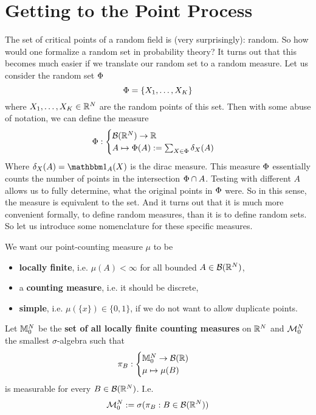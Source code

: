 \section{Getting to the Point Process}

The set of critical points of a random field is (very surprisingly): random.
So how would one formalize a random set in probability theory? It turns
out that this becomes much easier if we translate our random set to a random
measure. Let us consider the random set \(\Phi\)
\[
	\Phi = \{ X_1, \dots, X_K\}
\]
where \(X_1,\dots, X_K\in\mathbb{R}^N\) are the random points of this set. Then with some
abuse of notation, we can define the measure
\[
	\Phi :
	\begin{cases}
		\mathcal{B}(\mathbb{R}^N) \to \mathbb{R} \\
		A \mapsto \Phi(A):= \sum_{X\in \Phi}\delta_X(A) 
	\end{cases}
\]
Where \(\delta_X(A)=\ind_A(X)\) is the dirac measure. This measure \(\Phi\)
essentially counts the number of points in the intersection \(\Phi\cap A\).
Testing with different \(A\) allows us to fully determine, what
the original points in \(\Phi\) were. So in this sense, the measure is
equivalent to the set. And it turns out that it is much more convenient
formally, to define random measures, than it is to define random sets.
So let us introduce some nomenclature for these specific measures.

We want our point-counting measure \(\mu\) to be
\begin{itemize}
	\item \textbf{locally finite}, i.e. \(\mu(A) < \infty\) for all bounded
	\(A\in\mathcal{B}(\mathbb{R}^N)\),
	\item a \textbf{counting measure}, i.e. it should be discrete,
	\item \textbf{simple}, i.e. \(\mu(\{x\})\in\{0,1\}\), if we do not want
	to allow duplicate points.
\end{itemize}
Let \(\mathbb{M}^{N}_0\) be the \textbf{set of all locally finite counting measures}
on \(\mathbb{R}^N\) and \(\mathcal{M}^{N}_0\) the smallest \(\sigma\)-algebra
such that
\[
	\pi_B : \begin{cases}
		\mathbb{M}^{N}_0 \to \mathcal{B}(\mathbb{R})\\
		\mu \mapsto \mu(B)
	\end{cases}
\]
is measurable for every \(B\in\mathcal{B}(\mathbb{R}^N)\). I.e.
\[
	\mathcal{M}^{N}_0 := \sigma(\pi_B : B\in\mathcal{B}(\mathbb{R}^N))
\]

